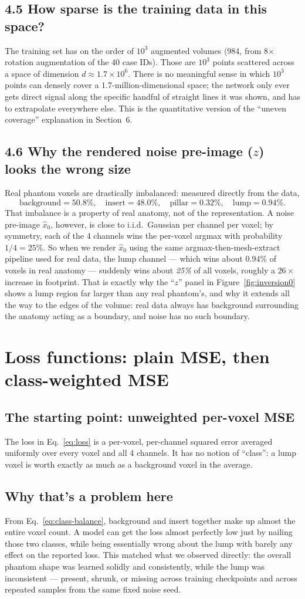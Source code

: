 \documentclass[11pt]{article}
\newcommand{\hsec}[1]{\section*{\color{hdrblue}#1}}
\newcommand{\hsub}[1]{\subsection*{#1}}
\begin{document}
\hsub{4.5 How sparse is the training data in this space?}
The training set has on the order of $10^3$ augmented volumes (984, from 8$\times$ rotation
augmentation of the 40 case IDs). Those are $10^3$ points scattered across a space of
dimension $d \approx 1.7\times 10^6$. There is no meaningful sense in which $10^3$ points can
densely cover a $1.7$-million-dimensional space; the network only ever gets direct signal
along the specific handful of straight lines it was shown, and has to extrapolate everywhere
else. This is the quantitative version of the ``uneven coverage'' explanation in Section~6.

\hsub{4.6 Why the rendered noise pre-image ($z$) looks the wrong size}
Real phantom voxels are drastically imbalanced: measured directly from the data,
\begin{equation}
\text{background} = 50.8\%,\quad \text{insert} = 48.0\%,\quad
\text{pillar} = 0.32\%,\quad \text{lump} = 0.94\%. \label{eq:class-balance}
\end{equation}
That imbalance is a property of real anatomy, not of the representation. A noise pre-image
$\hat x_0$, however, is close to i.i.d.\ Gaussian per channel per voxel; by symmetry, each of
the 4 channels wins the per-voxel argmax with probability $1/4 = 25\%$. So when we render
$\hat x_0$ using the same argmax-then-mesh-extract pipeline used for real data, the lump
channel --- which wins about $0.94\%$ of voxels in real anatomy --- suddenly wins about
\emph{25\%} of all voxels, roughly a $26\times$ increase in footprint. That is exactly why the
``$z$'' panel in Figure~\ref{fig:inversion0} shows a lump region far larger than any real
phantom's, and why it extends all the way to the edges of the volume: real data always has
background surrounding the anatomy acting as a boundary, and noise has no such boundary.

\hsec{Loss functions: plain MSE, then class-weighted MSE}

\hsub{The starting point: unweighted per-voxel MSE}
The loss in Eq.~\eqref{eq:loss} is a per-voxel, per-channel squared error averaged uniformly
over every voxel and all 4 channels. It has no notion of ``class'': a lump voxel is worth
exactly as much as a background voxel in the average.

\hsub{Why that's a problem here}
From Eq.~\eqref{eq:class-balance}, background and insert together make up almost the entire
voxel count. A model can get the loss almost perfectly low just by nailing those two classes,
while being essentially wrong about the lump with barely any effect on the reported loss. This
matched what we observed directly: the overall phantom shape was learned solidly and
consistently, while the lump was inconsistent --- present, shrunk, or missing across training
checkpoints and across repeated samples from the same fixed noise seed.
\end{document}
